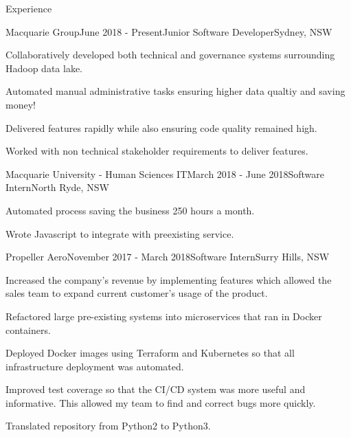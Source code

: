 \documentclass{resume} %
\begin{document}
\address{0411~$\cdot$~319$\cdot$~513 \\ contact@tylercash.xyz} %
\href{https://github.com/Tyler-Cash}{\color{blue}{Github}}



\begin{rSection}{Experience}


\begin{rSubsection}{Macquarie Group}{June 2018 - Present}{Junior Software Developer}{Sydney, NSW}
\item Collaboratively developed both technical and governance systems surrounding Hadoop data lake.
\item Automated manual administrative tasks ensuring higher data qualtiy and saving money! 
\item Delivered features rapidly while also ensuring code quality remained high.
\item Worked with non technical stakeholder requirements to deliver features.
\end{rSubsection}

\begin{rSubsection}{Macquarie University - Human Sciences IT}{March 2018 - June 2018}{Software Intern}{North Ryde, NSW}
\item Automated process saving the business 250 hours a month.
\item Wrote Javascript to integrate with preexisting service.
\end{rSubsection}

\begin{rSubsection}{Propeller Aero}{November 2017 - March 2018}{Software Intern}{Surry Hills, NSW}
\item Increased the company's revenue by implementing features which allowed the sales team to expand current customer's usage of the product.
\item Refactored large pre-existing systems into microservices that ran in Docker containers. 
\item Deployed Docker images using Terraform and Kubernetes so that all infrastructure deployment was automated.
\item Improved test coverage so that the CI/CD system was more useful and informative. This allowed my team to find and correct bugs more quickly.
\item Translated repository from Python2 to Python3.
\end{rSubsection}

\end{rSection}
\end{document}
